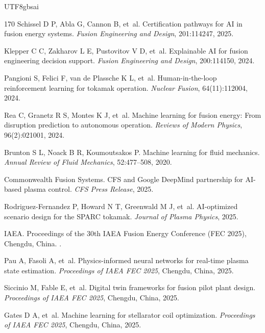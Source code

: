\documentclass[12pt,a4paper]{article}
\begin{document}
\begin{CJK}{UTF8}{gbsai}
\begin{thebibliography}{170}
Schissel D P, Abla G, Cannon B, et~al.
\newblock Certification pathways for AI in fusion energy systems.
\newblock \textit{Fusion Engineering and Design}, 201:114247, 2025.

Klepper C C, Zakharov L E, Pustovitov V D, et~al.
\newblock Explainable AI for fusion engineering decision support.
\newblock \textit{Fusion Engineering and Design}, 200:114150, 2024.

Pangioni S, Felici F, van de Plassche K L, et~al.
\newblock Human-in-the-loop reinforcement learning for tokamak operation.
\newblock \textit{Nuclear Fusion}, 64(11):112004, 2024.

Rea C, Granetz R S, Montes K J, et~al.
\newblock Machine learning for fusion energy: From disruption prediction to autonomous operation.
\newblock \textit{Reviews of Modern Physics}, 96(2):021001, 2024.

Brunton S L, Noack B R, Koumoutsakos P.
\newblock Machine learning for fluid mechanics.
\newblock \textit{Annual Review of Fluid Mechanics}, 52:477--508, 2020.

Commonwealth Fusion Systems.
\newblock CFS and Google DeepMind partnership for AI-based plasma control.
\newblock \textit{CFS Press Release}, 2025.

Rodriguez-Fernandez P, Howard N T, Greenwald M J, et~al.
\newblock AI-optimized scenario design for the SPARC tokamak.
\newblock \textit{Journal of Plasma Physics}, 2025.

IAEA.
\newblock Proceedings of the 30th IAEA Fusion Energy Conference (FEC 2025), Chengdu, China.
.

Pau A, Fasoli A, et~al.
\newblock Physics-informed neural networks for real-time plasma state estimation.
\newblock \textit{Proceedings of IAEA FEC 2025}, Chengdu, China, 2025.

Siccinio M, Fable E, et~al.
\newblock Digital twin frameworks for fusion pilot plant design.
\newblock \textit{Proceedings of IAEA FEC 2025}, Chengdu, China, 2025.

Gates D A, et~al.
\newblock Machine learning for stellarator coil optimization.
\newblock \textit{Proceedings of IAEA FEC 2025}, Chengdu, China, 2025.


\end{thebibliography}
\end{CJK}
\end{document}
